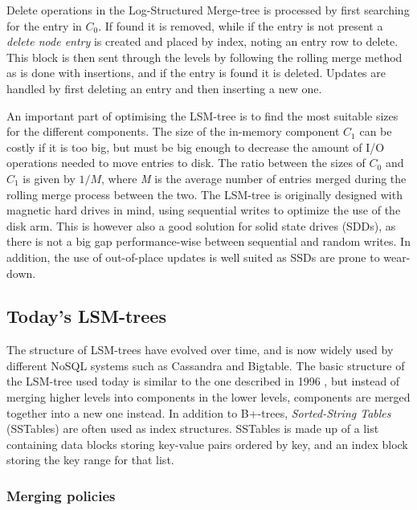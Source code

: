 \noindent
Delete operations in the Log-Structured Merge-tree is processed by first searching for the entry in $C_0$. If found it is removed, while if the entry is not present a \emph{delete node entry} is created and placed by index, noting an entry row to delete. This block is then sent through the levels by following the rolling merge method as is done with insertions, and if the entry is found it is deleted. Updates are handled by first deleting an entry and then inserting a new one.
\newline

\noindent
An important part of optimising the LSM-tree is to find the most suitable sizes for the different components. The size of the in-memory component $C_1$ can be costly if it is too big, but must be big enough to decrease the amount of I/O operations needed to move entries to disk. The ratio between the sizes of $C_0$ and $C_1$ is given by $1/M$, where \emph{M} is the average number of entries merged during the rolling merge process between the two. The LSM-tree is originally designed with magnetic hard drives in mind, using sequential writes to optimize the use of the disk arm. This is however also a good solution for solid state drives (SDDs), as there is not a big gap performance-wise between sequential and random writes. In addition, the use of out-of-place updates is well suited as SSDs are prone to wear-down\cite{LSMSDD}.

\subsection{Today's LSM-trees}
The structure of LSM-trees have evolved over time, and is now widely used by different NoSQL systems such as Cassandra\cite{Cassandra} and Bigtable\cite{Bigtable}. The basic structure of the LSM-tree used today is similar to the one described in 1996 \cite{LSMTree}, but instead of merging higher levels into components in the lower levels, components are merged together into a new one instead\cite{LSMSurvey}. In addition to B+-trees, \emph{Sorted-String Tables} (SSTables) are often used as index structures. SSTables is made up of a list containing data blocks storing key-value pairs ordered by key, and an index block storing the key range for that list. 

\subsubsection{Merging policies}

